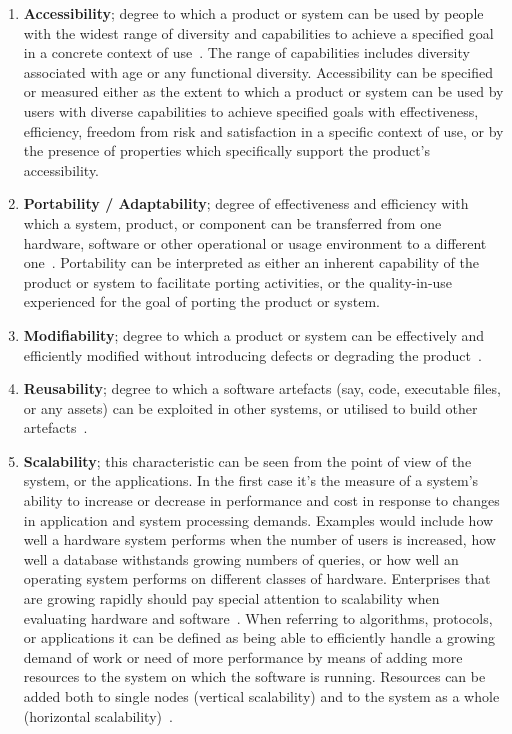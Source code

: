 \begin{enumerate}
    \item \textbf{Accessibility}; degree to which a product or system can be used by people with the widest range of diversity and capabilities to achieve a specified goal in a concrete context of use~\cite{iso_25010_2011_2017}. The range of capabilities includes diversity associated with age or any functional diversity. Accessibility can be specified or measured either as the extent to which a product or system can be used by users with diverse capabilities to achieve specified goals with effectiveness, efficiency, freedom from risk and satisfaction in a specific context of use, or by the presence of properties which specifically support the product's accessibility.
    
    \item \textbf{Portability / Adaptability}; degree of effectiveness and efficiency with which a system, product, or component can be transferred from one hardware, software or other operational or usage environment to a different one~\cite{iso_25010_2011_2017}. Portability can be interpreted as either an inherent capability of the product or system to facilitate porting activities, or the quality-in-use experienced for the goal of porting the product or system.

    \item \textbf{Modifiability}; degree to which a product or system can be effectively and efficiently modified without introducing defects or degrading the product~\cite{iso_25010_2011_2017}.

    \item \textbf{Reusability}; degree to which a software artefacts (say, code, executable files, or any assets) can be exploited in other systems, or utilised to build other artefacts~\cite{iso_25010_2011_2017}.

    \item \textbf{Scalability}; this characteristic can be seen from the point of view of the system, or the applications. In the first case
    it's the measure of a system's ability to increase or decrease in performance and cost in response to changes in application and system processing demands. Examples would include how well a hardware system performs when the number of users is increased, how well a database withstands growing numbers of queries, or how well an operating system performs on different classes of hardware. Enterprises that are growing rapidly should pay special attention to scalability when evaluating hardware and software~\cite{gartner_2021}. When referring to algorithms, protocols, or applications it can be defined as being able to efficiently handle a growing demand of work or need of more performance by means of adding more resources to the system on which the software is running. Resources can be added both to single nodes (vertical scalability) and to the system as a whole (horizontal scalability)~\cite{bondi_2000}.


\end{enumerate}
